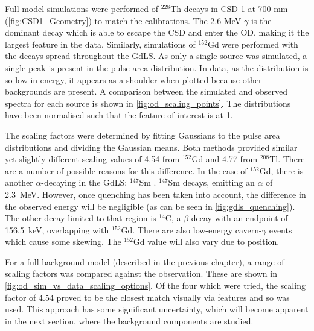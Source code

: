 \par
Full model simulations were performed of ${}^{228}$Th decays in CSD-1 at 700 mm (\autoref{fig:CSD1_Geometry}) to match the calibrations.
The 2.6 MeV $\gamma$ is the dominant decay which is able to escape the CSD and enter the OD, making it the largest feature in the data.
Similarly, simulations of ${}^{152}$Gd were performed with the decays spread throughout the GdLS.
As only a single source was simulated, a single peak is present in the pulse area distribution.
In data, as the distribution is so low in energy, it appears as a shoulder when plotted because other backgrounds are present.
A comparison between the simulated and observed spectra for each source is shown in \autoref{fig:od_scaling_points}.
The distributions have been normalised such that the feature of interest is at 1.

\par
The scaling factors were determined by fitting Gaussians to the pulse area distributions and dividing the Gaussian means.
Both methods provided similar yet slightly different scaling values of 4.54 from ${}^{152}$Gd and 4.77 from ${}^{208}$Tl.
There are a number of possible reasons for this difference.
In the case of ${}^{152}$Gd, there is another $\alpha$-decaying in the GdLS: ${}^{147}$Sm \cite{scotthaselschwardt_thesis_ref}.
${}^{147}$Sm decays, emitting an $\alpha$ of 2.3~MeV. 
However, once quenching has been taken into account, the difference in the observed energy will be negligible (as can be seen in \autoref{fig:gdls_quenching}).
The other decay limited to that region is ${}^{14}$C, a $\beta$ decay with an endpoint of 156.5~keV, overlapping with ${}^{152}$Gd.
There are also low-energy cavern-$\gamma$ events which cause some skewing.
The ${}^{152}$Gd value will also vary due to position.

\par
For a full background model (described in the previous chapter), a range of scaling factors was compared against the observation.
These are shown in \autoref{fig:od_sim_vs_data_scaling_options}.
Of the four which were tried, the scaling factor of 4.54 proved to be the closest match visually via features and so was used.
This approach has some significant uncertainty, which will become apparent in the next section, where the background components are studied.







